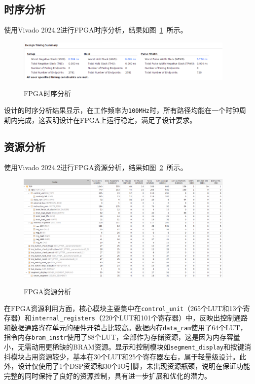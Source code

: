 \documentclass[lang=cn,a4paper,newtx]{elegantpaper}
\begin{document}
\subsection{时序分析}
使用Vivado 2024.2进行FPGA时序分析，结果如图~\ref{fig:timing}~所示。
\begin{figure}[htbp]
  \centering
  \caption{FPGA时序分析}
  \includegraphics[width = 0.95\textwidth]{figure/timing_summary.png}
  \label{fig:timing}
\end{figure}

设计的时序分析结果显示，在工作频率为\texttt{100MHz}时，所有路径均能在一个时钟周期内完成，这表明设计在FPGA上运行稳定，满足了设计要求。
\subsection{资源分析}
使用Vivado 2024.2进行FPGA资源分析，结果如图~\ref{tab:resource}~所示。
\begin{figure}[htbp]
  \centering
  \caption{FPGA资源分析}
  \includegraphics[width = 0.95\textwidth]{figure/resource_list.png}
  \label{tab:resource}
\end{figure}

在FPGA资源利用方面，核心模块主要集中在\texttt{control\_unit}（265个LUT和13个寄存器）和\texttt{internal\_registers}（220个LUT和101个寄存器）中，反映出控制通路和数据通路寄存单元的硬件开销占比较高。数据内存\texttt{data\_ram}使用了64个LUT，指令内存\texttt{bram\_instr}使用了88个LUT，全部作为存储资源，这是因为内存容量小，无需动用更稀缺的BRAM资源。显示和控制模块如\texttt{segment\_display}和按键消抖模块占用资源较少，基本在30个LUT和25个寄存器左右，属于轻量级设计。此外，设计仅使用了1个DSP资源和30个IO引脚，未出现资源瓶颈，说明在保证功能完整的同时保持了良好的资源控制，具有进一步扩展和优化的潜力。
\end{document}
